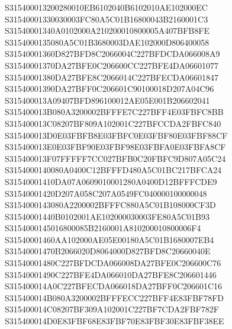 \documentclass[12pt,a4paper]{article}
\begin{document}
\begin{framed}
{S315400013200280010EB6102040B6102010AE102000EC\newline
S31540001330030003FC80A5C01B16800043B2160001C3\newline
S31540001340A0102000A210200010800005A407BFB8FE\newline
S3154000135080A5C01B3680003DAE102000D806400058\newline
S31540001360D827BFD8C2066004C227BFDCDA066008A9\newline
S31540001370DA27BFE0C206600CC227BFE4DA06601077\newline
S31540001380DA27BFE8C2066014C227BFECDA06601847\newline
S31540001390DA27BFF0C206601C90100018D207A04C96\newline
S315400013A09407BFD896100012AE05E001B206602041\newline
S315400013B080A3200002BFFFE7C227BFF4E03FBFC8BB\newline
S315400013C08207BF809A102001C227BFCCDA2FBFC840\newline
S315400013D0E03FBFB8E03FBFC0E03FBF80E03FBF88CF\newline
S315400013E0E03FBF90E03FBF98E03FBFA0E03FBFA8CF\newline
S315400013F07FFFFF7CC027BFB0C20FBFC9D807A05C24\newline
S3154000140080A0400C12BFFFD480A5C01BC217BFCA24\newline
S31540001410DA07A0609010001280A0400D12BFFFCDE9\newline
S31540001420D207A058C207A0549FC040000100000048\newline
S3154000143080A2200002BFFFC880A5C01B108000CF3D\newline
S31540001440B0102001AE102000030003FE80A5C01B93\newline
S3154000145016800085B2160001A810200010800006F4\newline
S31540001460AA102000AE05E00180A5C01B1680007EB4\newline
S31540001470B2066020D8064000D827BFD8C20660040E\newline
S31540001480C227BFDCDA066008DA27BFE0C206600C76\newline
S31540001490C227BFE4DA066010DA27BFE8C206601446\newline
S315400014A0C227BFECDA066018DA27BFF0C206601C16\newline
S315400014B080A3200002BFFFECC227BFF4E83FBF78FD\newline
S315400014C08207BF309A102001C227BF7CDA2FBF782F\newline
S315400014D0E83FBF68E83FBF70E83FBF30E83FBF38EE\newline
}
\end{framed}
\end{document}

